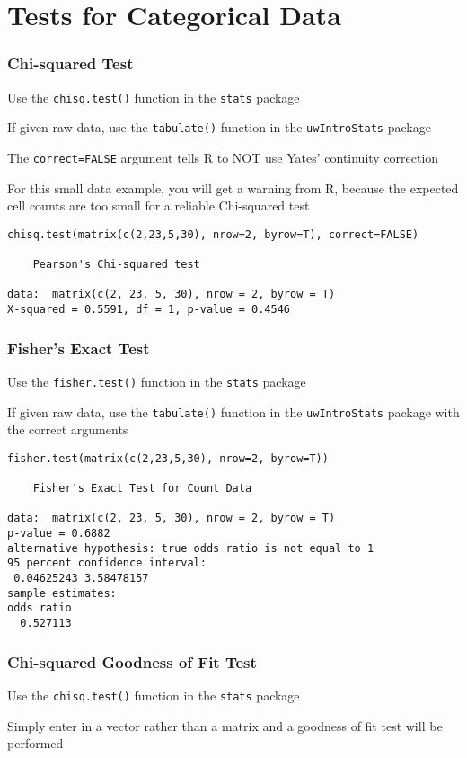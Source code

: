 \documentclass[pdf]{beamer}
\begin{document}
\section{Tests for Categorical Data}
\begin{frame}[fragile]
\frametitle{Chi-squared Test}
Use the \texttt{chisq.test()} function in the \texttt{stats} package

If given raw data, use the \texttt{tabulate()} function in the \texttt{uwIntroStats} package

The \texttt{correct=FALSE} argument tells R to NOT use Yates' continuity correction

For this small data example, you will get a warning from R, because the expected cell counts are too small for a reliable Chi-squared test

{\fontsize{6pt}{7.2}\selectfont
\begin{verbatim}
chisq.test(matrix(c(2,23,5,30), nrow=2, byrow=T), correct=FALSE)

	Pearson's Chi-squared test

data:  matrix(c(2, 23, 5, 30), nrow = 2, byrow = T)
X-squared = 0.5591, df = 1, p-value = 0.4546
\end{verbatim}}
\end{frame}

\begin{frame}[fragile]
\frametitle{Fisher's Exact Test}
Use the \texttt{fisher.test()} function in the \texttt{stats} package

If given raw data, use the \texttt{tabulate()} function in the \texttt{uwIntroStats} package with the correct arguments

{\fontsize{6pt}{7.2}\selectfont
\begin{verbatim}
fisher.test(matrix(c(2,23,5,30), nrow=2, byrow=T))

	Fisher's Exact Test for Count Data

data:  matrix(c(2, 23, 5, 30), nrow = 2, byrow = T)
p-value = 0.6882
alternative hypothesis: true odds ratio is not equal to 1
95 percent confidence interval:
 0.04625243 3.58478157
sample estimates:
odds ratio 
  0.527113 

\end{verbatim}}
\end{frame}

\begin{frame}[fragile]
\frametitle{Chi-squared Goodness of Fit Test}
Use the \texttt{chisq.test()} function in the \texttt{stats} package

Simply enter in a vector rather than a matrix and a goodness of fit test will be performed

\end{frame}
\end{document}
